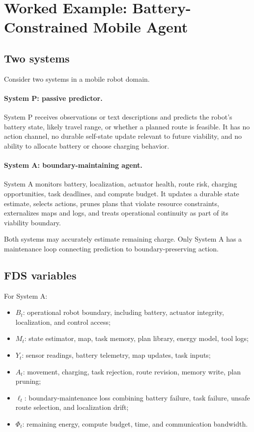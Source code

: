 \documentclass[10pt,a4paper,twocolumn,aps,prl]{revtex4-2}
\begin{document}
\section{Worked Example: Battery-Constrained Mobile Agent}

\subsection{Two systems}

Consider two systems in a mobile robot domain.

\paragraph{System P: passive predictor.} System P receives observations or text descriptions and predicts the robot's battery state, likely travel range, or whether a planned route is feasible. It has no action channel, no durable self-state update relevant to future viability, and no ability to allocate battery or choose charging behavior.

\paragraph{System A: boundary-maintaining agent.} System A monitors battery, localization, actuator health, route risk, charging opportunities, task deadlines, and compute budget. It updates a durable state estimate, selects actions, prunes plans that violate resource constraints, externalizes maps and logs, and treats operational continuity as part of its viability boundary.

Both systems may accurately estimate remaining charge. Only System A has a maintenance loop connecting prediction to boundary-preserving action.

\subsection{FDS variables}

For System A:
\begin{itemize}[leftmargin=2em]
    \item $B_t$: operational robot boundary, including battery, actuator integrity, localization, and control access;
    \item $M_t$: state estimator, map, task memory, plan library, energy model, tool logs;
    \item $Y_t$: sensor readings, battery telemetry, map updates, task inputs;
    \item $A_t$: movement, charging, task rejection, route revision, memory write, plan pruning;
    \item $\ell_t$: boundary-maintenance loss combining battery failure, task failure, unsafe route selection, and localization drift;
    \item $\Phi_t$: remaining energy, compute budget, time, and communication bandwidth.
\end{itemize}
\end{document}
